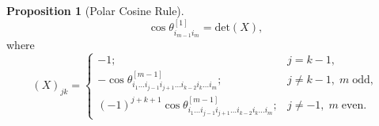\documentclass[fleqn,11pt,twoside]{article}
\theoremstyle{definition}
\newtheorem{prop}{Proposition}
\begin{document}
\begin{prop}[Polar Cosine Rule]
\begin{equation}
\cos\theta^{[1]}_{i_{m-1}i_{m}}=\mathrm{det}(X),
\end{equation}
where
\begin{equation}\label{eq:X} 
(X)_{jk}=\left\{\begin{array}{cc}
-1; & j=k-1,\\
-\cos\theta^{[m-1]}_{i_1\dots i_{j-1}i_{j+1}\dots i_{k-2}i_k\dots i_m}; & j\neq k-1,\; m \;\mathrm{odd},\\
(-1)^{j+k+1}\cos\theta^{[m-1]}_{i_1\dots i_{j-1}i_{j+1}\dots i_{k-2}i_k\dots i_m}; & j\neq-1,\; m\; \mathrm{even}.
\end{array}\right.
\end{equation}
\end{prop}
\end{document}
